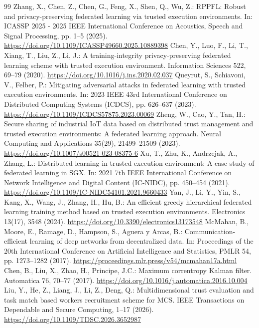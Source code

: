 \documentclass[11pt, a4paper, UTF8, fontset=fandol]{ctexart}
\begin{document}
\begin{thebibliography}{99}
     Zhang, X., Chen, Z., Chen, G., Feng, X., Shen, Q., Wu, Z.: RPPFL: Robust and privacy-preserving federated learning via trusted execution environments. In: ICASSP 2025 - 2025 IEEE International Conference on Acoustics, Speech and Signal Processing, pp. 1--5 (2025). \url{https://doi.org/10.1109/ICASSP49660.2025.10889398}
     Chen, Y., Luo, F., Li, T., Xiang, T., Liu, Z., Li, J.: A training-integrity privacy-preserving federated learning scheme with trusted execution environment. Information Sciences 522, 69--79 (2020). \url{https://doi.org/10.1016/j.ins.2020.02.037}
     Queyrut, S., Schiavoni, V., Felber, P.: Mitigating adversarial attacks in federated learning with trusted execution environments. In: 2023 IEEE 43rd International Conference on Distributed Computing Systems (ICDCS), pp. 626--637 (2023). \url{https://doi.org/10.1109/ICDCS57875.2023.00069}
     Zheng, W., Cao, Y., Tan, H.: Secure sharing of industrial IoT data based on distributed trust management and trusted execution environments: A federated learning approach. Neural Computing and Applications 35(29), 21499--21509 (2023). \url{https://doi.org/10.1007/s00521-023-08375-6}
     Xu, T., Zhu, K., Andrzejak, A., Zhang, L.: Distributed learning in trusted execution environment: A case study of federated learning in SGX. In: 2021 7th IEEE International Conference on Network Intelligence and Digital Content (IC-NIDC), pp. 450--454 (2021). \url{https://doi.org/10.1109/IC-NIDC54101.2021.9660433}
     Yan, J., Li, Y., Yin, S., Kang, X., Wang, J., Zhang, H., Hu, B.: An efficient greedy hierarchical federated learning training method based on trusted execution environments. Electronics 13(17), 3548 (2024). \url{https://doi.org/10.3390/electronics13173548}
     McMahan, B., Moore, E., Ramage, D., Hampson, S., Aguera y Arcas, B.: Communication-efficient learning of deep networks from decentralized data. In: Proceedings of the 20th International Conference on Artificial Intelligence and Statistics, PMLR 54, pp. 1273--1282 (2017). \url{https://proceedings.mlr.press/v54/mcmahan17a.html}
     Chen, B., Liu, X., Zhao, H., Principe, J.C.: Maximum correntropy Kalman filter. Automatica 76, 70--77 (2017). \url{https://doi.org/10.1016/j.automatica.2016.10.004}
     Liu, Y., He, Z., Liang, J., Li, Z., Deng, Q.: Multidimensional trust evaluation and task match based workers recruitment scheme for MCS. IEEE Transactions on Dependable and Secure Computing, 1--17 (2026). \url{https://doi.org/10.1109/TDSC.2026.3652987}
\end{thebibliography}
\end{document}
